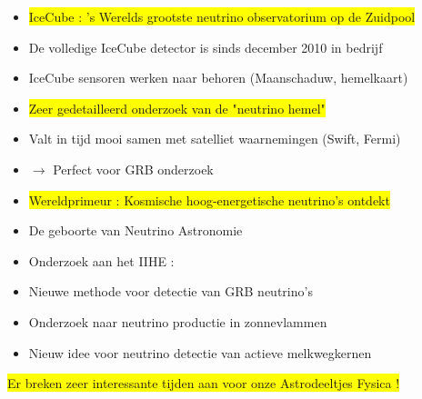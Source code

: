 \onecolumn
\begin{itemize}
\item \colorbox{yellow}{IceCube : 's Werelds grootste neutrino observatorium op de Zuidpool}
\item[] De volledige IceCube detector is sinds december 2010 in bedrijf
\item[] IceCube sensoren werken naar behoren (Maanschaduw, hemelkaart)
\item \colorbox{yellow}{Zeer gedetailleerd onderzoek van de "neutrino hemel"}
\item[] Valt in tijd mooi samen met satelliet waarnemingen (Swift, Fermi)
\item[] $\rightarrow$ Perfect voor GRB onderzoek
\item \colorbox{yellow}{Wereldprimeur : Kosmische hoog-energetische neutrino's ontdekt}
\item[] \begin{center}{\blue De geboorte van Neutrino Astronomie}\end{center}
\item {\red Onderzoek aan het IIHE :}
\item[] Nieuwe methode voor detectie van GRB neutrino's
\item[] Onderzoek naar neutrino productie in zonnevlammen
\item[] Nieuw idee voor neutrino detectie van actieve melkwegkernen 
\end{itemize}
%
\begin{center}
\colorbox{yellow}{Er breken zeer interessante tijden aan voor onze Astrodeeltjes Fysica !}
\end{center}

